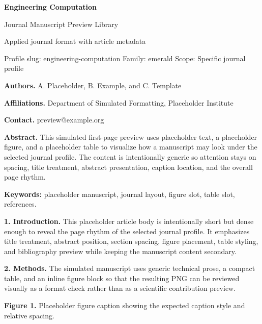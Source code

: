 \documentclass[10pt,a4paper]{article}
\begin{document}
\begin{center}
{\LARGE\bfseries Engineering Computation}\par
\vspace{0.25em}
{\small Journal Manuscript Preview Library}\par
\vspace{0.15em}
{\footnotesize Applied journal format with article metadata}\par
\vspace{0.2em}
{\footnotesize Profile slug: engineering-computation \quad Family: emerald \quad Scope: Specific journal profile}
\end{center}
\vspace{0.2em}



\noindent\textbf{Authors.} A. Placeholder, B. Example, and C. Template\par
\noindent\textbf{Affiliations.} Department of Simulated Formatting, Placeholder Institute\par
\noindent\textbf{Contact.} preview@example.org\par
\vspace{0.4em}
\noindent\textbf{Abstract.} This simulated first-page preview uses placeholder text, a placeholder figure, and a placeholder table to visualize how a manuscript may look under the selected journal profile. The content is intentionally generic so attention stays on spacing, title treatment, abstract presentation, caption location, and the overall page rhythm.\par\vspace{0.6em}
\noindent\textbf{Keywords:} placeholder manuscript, journal layout, figure slot, table slot, references.\par\vspace{0.6em}


\small
\textbf{1. Introduction.} This placeholder article body is intentionally short but dense enough to reveal the page rhythm of the selected journal profile. It emphasizes title treatment, abstract position, section spacing, figure placement, table styling, and bibliography preview while keeping the manuscript content secondary.

\textbf{2. Methods.} The simulated manuscript uses generic technical prose, a compact table, and an inline figure block so that the resulting PNG can be reviewed visually as a format check rather than as a scientific contribution preview.


\begin{center}\end{center}\noindent\textbf{Figure 1.} Placeholder figure caption showing the expected caption style and relative spacing.\par\vspace{0.5em}
\end{document}
